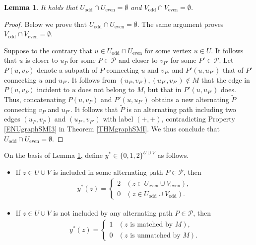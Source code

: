 \documentclass[11pt,a4paper,showkeys]{article}
\theoremstyle{plain}
\newtheorem{lemma}[theorem]{Lemma}
\theoremstyle{definition}
\newcommand{\Ueven}{U_{\mathrm{even}}}
\newcommand{\Uodd}{U_{\mathrm{odd}}}
\newcommand{\Veven}{V_{\mathrm{even}}}
\newcommand{\Vodd}{V_{\mathrm{odd}}}
\begin{document}
\begin{lemma}
    \label{LEMdisjoint}
    It holds that $\Uodd \cap \Ueven = \emptyset$ and $\Vodd \cap \Veven = \emptyset$.
\end{lemma}


\begin{proof}
    Below we prove that $\Uodd \cap \Ueven = \emptyset$. 
    The same argument proves $\Vodd \cap \Veven = \emptyset$. 

    Suppose to the contrary that $u\in \Uodd \cap \Ueven$ for some vertex $u\in U$. 
    It follows that $u$ is closer to $u_P$ for some $P\in \mathcal{P}$ and 
    closer to $v_{P'}$ for some $P'\in \mathcal{P}$. 
    Let $P(u,v_P)$ denote a subpath of $P$ connecting $u$ and $v_P$, 
    and 
    $P'(u,u_{P'})$
    that of $P'$ connecting $u$ and $u_{P'}$. 
    It follows from $(u_P,v_P),(u_{P'},v_{P'})\not\in M$ that 
    the edge in $P(u,v_P)$ incident to $u$ does not belong to $M$, 
    but that in $P'(u,u_{P'})$ does. 
    Thus, 
    concatenating $P(u,v_P)$ and $P'(u,u_{P'})$ obtains a new alternating  
    $\tilde{P}$ connecting $v_P$ and $u_{P'}$. 
    It follows that $\tilde{P}$ is an alternating path including two edges $(u_P, v_P)$ and $(u_{P'}, v_{P'})$ 
    with label $(+,+)$, 
    contradicting Property \ref{ENUgraphSMI3} in Theorem \ref{THMgraphSMI}. 
    We thus conclude that $\Uodd \cap \Ueven = \emptyset$.     
\end{proof}

On the basis of Lemma \ref{LEMdisjoint}, 
define $y^*\in \{0,1,2\}^{U\cup V}$ as follows. 
\begin{itemize}
    \item If $z \in U\cup V$ is included in  some alternating path $P\in \mathcal{P}$, then 
    \begin{align}
    \label{EQySMI1}
    y^*(z) = 
    \begin{cases}
        2 & (z\in \Ueven\cup \Veven), \\
        0 & (z\in \Uodd \cup \Vodd). 
    \end{cases}
    \end{align}

    \item 
    If $z \in U\cup V$ is not included by any alternating path $P\in \mathcal{P}$, then 
    \begin{align}
    \label{EQySMI2}
    y^*(z) = 
    \begin{cases}
        1 & (\mbox{$z$ is matched by $M$}), \\
        0 & (\mbox{$z$ is unmatched by $M$}). 
    \end{cases}
    \end{align}
\end{itemize}
\end{document}
